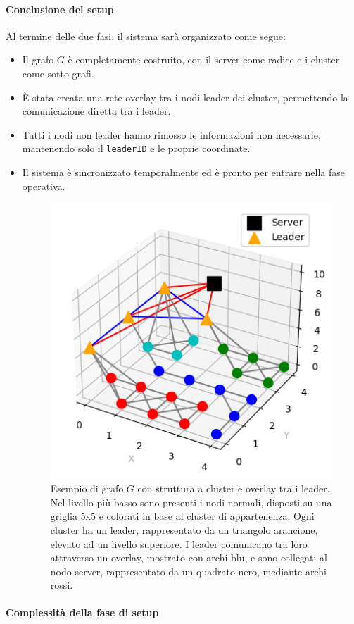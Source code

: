 \documentclass[12pt, a4paper]{report}
\begin{document}
\paragraph{Conclusione del setup}

Al termine delle due fasi, il sistema sar\`a organizzato come segue:

\begin{itemize}
    \item Il grafo $G$ \`e completamente costruito, con il server come radice e i cluster come sotto-grafi.
    \item \`E stata creata una rete overlay tra i nodi leader dei cluster, permettendo la comunicazione diretta tra i leader.
    \item Tutti i nodi non leader hanno rimosso le informazioni non necessarie, mantenendo solo il \texttt{leaderID} e le proprie coordinate.
    \item Il sistema \`e sincronizzato temporalmente ed \`e pronto per entrare nella fase operativa.

\begin{figure}
    \centering
    \includegraphics[width=0.5\linewidth]{images/setup/Esempio_Grafo_G.png}
    \caption{Esempio di grafo $G$ con struttura a cluster e overlay tra i leader. Nel livello pi\`u basso sono presenti i nodi normali, disposti su una griglia 5x5 e colorati in base al cluster di appartenenza. Ogni cluster ha un leader, rappresentato da un triangolo arancione, elevato ad un livello superiore. I leader comunicano tra loro attraverso un overlay, mostrato con archi blu, e sono collegati al nodo server, rappresentato da un quadrato nero, mediante archi rossi.}
    \label{fig:enter-label}
\end{figure}

\end{itemize}

\paragraph{Complessit\`a della fase di setup}
\end{document}
